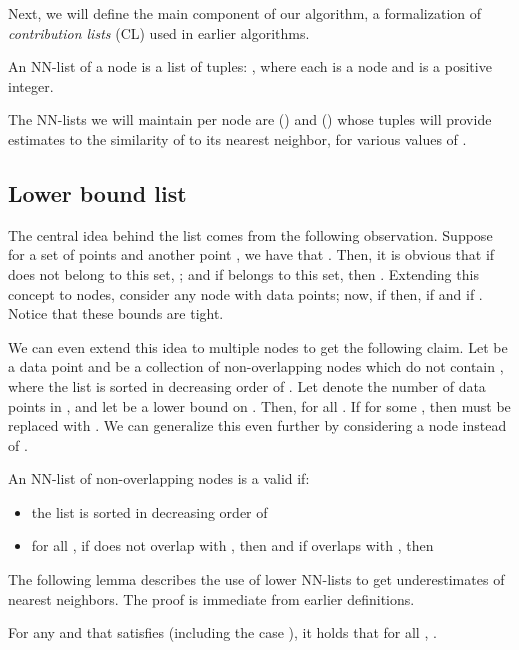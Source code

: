\documentclass[prodmode,letterpaper]{acmsmall}
\begin{document}
Next, we will define the main component of our algorithm, a formalization of
{\em contribution lists} (CL) used in earlier algorithms.

\begin{definition}
An NN-list of a node  is a list of tuples: , where each  is a node and  is a positive integer.
\end{definition}

The NN-lists we will maintain per node are () and () whose tuples will
provide estimates to the similarity of  to its  nearest neighbor, for various
values of .

\subsection{Lower bound list }
The central idea behind the  list comes from the following observation.
Suppose for a set of  points  and
another point , we have that . Then, it is obvious that
if  does not belong to this set, ; and if  belongs
to this set, then . Extending this concept to nodes,
consider any node  with  data points; now, if  then,
 if   and  if . Notice that these bounds are tight.

We can even extend this idea to multiple nodes to get the following claim. Let
 be a data point and  be a collection of non-overlapping
nodes which do not contain , where the list is sorted in decreasing order of
. Let  denote the number of data points in , and let
 be a lower bound on . Then, for all . If  for some , then 
must be replaced with . We can generalize this even further by
considering a node instead of .


\begin{definition}
An NN-list  of non-overlapping nodes is a
valid  if:  
\begin{itemize}
\item the list is sorted in decreasing order of 
\item for all , if  does not overlap with , then  and if  overlaps with , then 
\end{itemize}
\end{definition}


The following lemma describes the use of lower NN-lists to get underestimates of
nearest neighbors. The proof is immediate from earlier definitions.
\begin{lemma}\label{lemma:NNL-lemma}
    For any  and  that satisfies  (including the case ), it holds that for all , .
\end{lemma}
\end{document}
